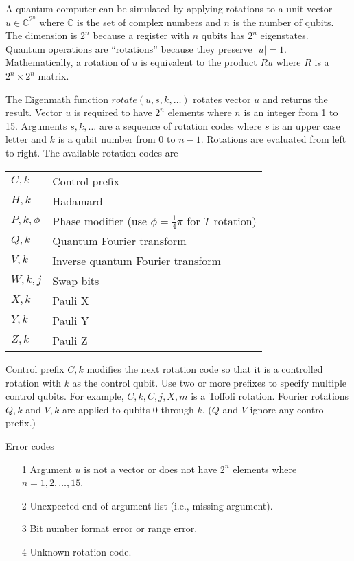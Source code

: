 A quantum computer can be simulated by applying rotations to a
unit vector
$u\in\mathbb{C}^{2^n}$ where $\mathbb{C}$ is the set of complex numbers
and $n$ is the number of qubits.
The dimension is $2^n$ because a register with $n$ qubits
has $2^n$ eigenstates.
Quantum operations are ``rotations'' because they preserve $|u|=1$.
Mathematically, a rotation of $u$ is equivalent to the product $Ru$
where $R$ is a $2^n\times2^n$ matrix.

\bigskip
\noindent
The Eigenmath function
$rotate(u,s,k,\ldots)$
rotates vector $u$ and returns the result.
Vector $u$ is required to have $2^n$ elements where $n$ is an
integer from 1 to 15.
Arguments $s,k,\ldots$ are a sequence of rotation codes
where $s$ is an upper case letter and $k$ is a qubit number
from 0 to $n-1$.
Rotations are evaluated from left to right.
The available rotation codes are

\begin{center}
\begin{tabular}{ll}
$C,k$ & Control prefix
\\
$H,k$ & Hadamard
\\
$P,k,\phi$ & Phase modifier (use $\phi=\tfrac{1}{4}\pi$ for $T$ rotation)
\\
$Q,k$ & Quantum Fourier transform
\\
$V,k$ & Inverse quantum Fourier transform
\\
$W,k,j$ & Swap bits
\\
$X,k$ & Pauli X
\\
$Y,k$ & Pauli Y
\\
$Z,k$ & Pauli Z
\end{tabular}
\end{center}

\noindent
Control prefix $C,k$ modifies the next rotation code so that it
is a controlled rotation with $k$ as the control qubit.
Use two or more prefixes to specify multiple control qubits.
For example, $C,k,C,j,X,m$ is a Toffoli rotation.
Fourier rotations $Q,k$ and $V,k$ are applied to qubits 0 through $k$.
($Q$ and $V$ ignore any control prefix.)

\bigskip
\noindent
Error codes
\begin{itemize}
\item[1] Argument $u$ is not a vector or does not have $2^n$ elements where $n=1,2,\ldots,15$.
\item[2] Unexpected end of argument list (i.e., missing argument).
\item[3] Bit number format error or range error.
\item[4] Unknown rotation code.
\end{itemize}

